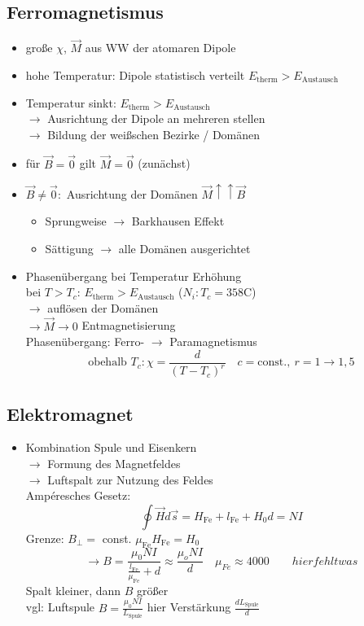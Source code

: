 \documentclass[titlepage,12pt,a4paper,ngerman]{report}
\newcommand{\tx}[1]{\textrm{#1}}
\begin{document}
\subsection{Ferromagnetismus}
\begin{itemize}
	\item große $\chi$, $\vec{M}$ aus WW der atomaren Dipole
	\item hohe Temperatur: Dipole statistisch verteilt $E_{\tx{therm}}>E_{\tx{Austausch}}$
	\item Temperatur sinkt: $E_{\tx{therm}}>E_{\tx{Austausch}}$\\
	$\rightarrow$ Ausrichtung der Dipole an mehreren stellen\\
	$\rightarrow$ Bildung der weißschen Bezirke / Domänen
	\item für $\vec{B} = \vec{0}$ gilt $ \vec{M} = \vec{0}$ (zunächst)
	\item $\vec{B} \neq \vec{0}:$ Ausrichtung der Domänen $\vec{M} \uparrow \uparrow \vec{B}$
	\begin{itemize}
		\item Sprungweise $\rightarrow$ Barkhausen Effekt
		\item Sättigung $\rightarrow$ alle Domänen ausgerichtet
	\end{itemize}
	\item Phasenübergang bei Temperatur Erhöhung\\
	bei $T>T_c$: $E_{\tx{therm}}>E_{\tx{Austausch}}$  ($N_i: T_c = 358\tx{C}$)\\
	$\rightarrow$ auflösen der Domänen\\
	$\rightarrow \vec{M} \rightarrow 0$ Entmagnetisierung\\
	Phasenübergang: Ferro- $\rightarrow$ Paramagnetismus
	$$\tx{obehalb } T_c: \chi = \frac{d}{(T-T_c)^r} \quad c = \tx{const.},\ r = 1 \rightarrow 1,5$$
\end{itemize}
\subsection{Elektromagnet}
\begin{itemize}
	\item Kombination Spule und Eisenkern\\
	$\rightarrow$ Formung des Magnetfeldes\\
	$\rightarrow$ Luftspalt zur Nutzung des Feldes\\
	Ampéresches Gesetz: $$\oint \vec{H}d\vec{s}=H_{\tx{Fe}}+l_{\tx{Fe}} + H_0d=NI$$
	Grenze: $B_\perp =$ const. $\mu_{\tx{Fe}} H_{\tx{Fe}} = H_0$\\
	$$\rightarrow B = \frac{\mu_0 N I}{\frac{l_{\tx{Fe}}}{\mu_{\tx{Fe}}}+d} \approx \frac{\mu_o NI}{d}\quad \mu_{Fe}\approx 4000 \qquad  hier fehlt was$$
	Spalt kleiner, dann $B$ größer\\
	vgl: Luftspule $B= \frac{\mu_0 NI}{L_{\tx{Spule}}}$ hier Verstärkung $\frac{dL_{\tx{Spule}}}{d}$
\end{itemize}
\end{document}
